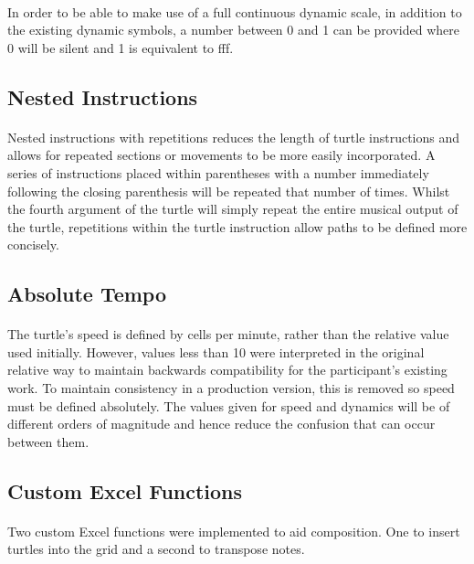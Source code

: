 \paragraph{} In order to be able to make use of a full continuous dynamic scale, in addition to the existing dynamic symbols, a number between 0 and 1 can be provided where 0 will be silent and 1 is equivalent to fff.

\subsection{Nested Instructions}

\paragraph{} Nested instructions with repetitions reduces the length of turtle instructions and allows for repeated sections or movements to be more easily incorporated. A series of instructions placed within parentheses with a number immediately following the closing parenthesis will be repeated that number of times. Whilst the fourth argument of the turtle will simply repeat the entire musical output of the turtle, repetitions within the turtle instruction allow paths to be defined more concisely.

\subsection{Absolute Tempo}

\paragraph{} The turtle's speed is defined by cells per minute, rather than the relative value used initially. However, values less than 10 were interpreted in the original relative way to maintain backwards compatibility for the participant's existing work. To maintain consistency in a production version, this is removed so speed must be defined absolutely. The values given for speed and dynamics will be of different orders of magnitude and hence reduce the confusion that can occur between them.

\subsection{Custom Excel Functions}

\paragraph{} Two custom Excel functions were implemented to aid composition. One to insert turtles into the grid and a second to transpose notes.


